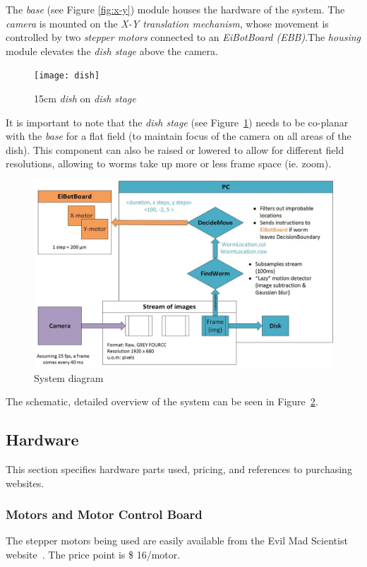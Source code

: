 \documentclass[main.tex]{subfiles}
\begin{document}
The \textit{base} (see Figure \ref{fig:x-y}) module houses the hardware of the system. The \textit{camera} is mounted on the \textit{X-Y translation mechanism}, whose movement is controlled by two \textit{stepper motors} connected to an \textit{EiBotBoard (EBB)}.The \textit{housing} module elevates the \textit{dish stage} above the camera. 

\begin{figure}[!htbp]
  \centering
  \texttt{[image: dish]}
  \caption{15cm \textit{dish} on \textit{dish stage}}
  \label{fig:dish}
\end{figure}


It is important to note that the \textit{dish stage} (see Figure~\ref{fig:dish})  needs to be co-planar with the \textit{base} for a flat field (to maintain focus of the camera on all areas of the dish). This component can also be raised or lowered to allow for different field resolutions, allowing to worms take up more or less frame space (ie. zoom). \\ %

\begin{figure}[!htbp]
  \centering
  \includegraphics[scale = 0.5]{system}
  \caption{System diagram}
  \label{fig:system}
\end{figure}


The schematic, detailed overview of the system can be seen in Figure~\ref{fig:system}. 

\subsection{Hardware}
This section specifies hardware parts used, pricing, and references to purchasing websites.
\subsubsection{Motors and Motor Control Board}
The stepper motors being used are easily available from the Evil Mad Scientist website~\cite{EvilMadmotor}. The price point is \$ 16/motor.\\
\end{document}
